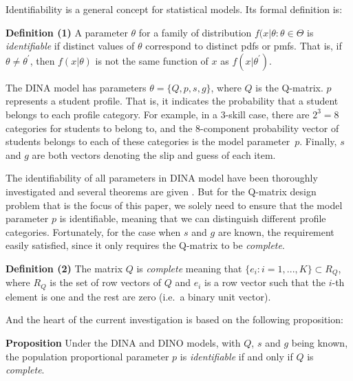 \documentclass{edm_template}
\newcommand{\Michel}[1]{{\textcolor{purple}{[#1]}}}
\begin{document}
Identifiability is a general concept for statistical models. Its formal definition is:

\textbf{Definition (1)} \cite{casella2002statistical} A parameter $\theta$ for a family of distribution ${f(x|\theta: \theta \in \Theta}$ is \textit{identifiable} if distinct values of $\theta$ correspond to distinct pdfs or pmfs. That is, if $\theta \neq \theta^{\prime}$, then $f(x|\theta)$ is not the same function of $x$ as $f(x|\theta^{\prime})$.

The DINA model has parameters $\theta = \{Q, p, s, g\}$, where $Q$ is the Q-matrix. $p$ represents a student profile. That is, it indicates the probability that a student belongs to each profile category. For example, in a 3-skill case, there are $2^3=8$ categories for students to belong to, and the 8-component probability vector of students belongs to each of these categories is the model parameter~$p$. Finally, $s$ and $g$ are both vectors denoting the slip and guess of each item.


The identifiability of all parameters in DINA model have been thoroughly investigated and several theorems are given \cite{xu2015identifiability}. But for the Q-matrix design problem that is the focus of this paper, we solely need to ensure that the model parameter $p$ is identifiable, meaning that we can distinguish different profile categories. Fortunately, for the case when $s$ and $g$ are known, the requirement easily satisfied, since it only requires the Q-matrix to be \textit{complete}.

\textbf{Definition (2)} \cite{xu2015identifiability}  The matrix $Q$ is \textit{complete} meaning that $\{e_{i}:i=1,...,K\} \subset R_{Q}$, where $R_{Q}$ is the set of row vectors of $Q$ and $e_{i}$ is a row vector such that the $i$-th element is one and the rest are zero (i.e.\ a binary unit vector).

And the heart of the current investigation is based on the following proposition:

\textbf{Proposition} \cite{xu2015identifiability} Under the DINA and DINO models, with $Q$, $s$ and $g$ being known, the population proportional parameter $p$ is \textit{identifiable} if and only if $Q$ is \textit{complete}.

   
%
\end{document}
